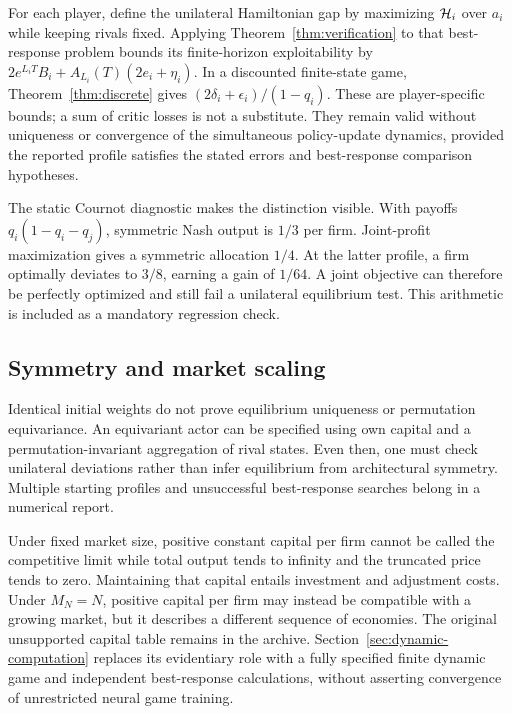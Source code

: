 For each player, define the unilateral Hamiltonian gap by maximizing $\mathcal H_i$ over $a_i$ while keeping rivals fixed. Applying Theorem~\ref{thm:verification} to that best-response problem bounds its finite-horizon exploitability by $2e^{L_iT}B_i+A_{L_i}(T)(2e_i+\eta_i)$. In a discounted finite-state game, Theorem~\ref{thm:discrete} gives $(2\delta_i+\epsilon_i)/(1-q_i)$. These are player-specific bounds; a sum of critic losses is not a substitute. They remain valid without uniqueness or convergence of the simultaneous policy-update dynamics, provided the reported profile satisfies the stated errors and best-response comparison hypotheses.

The static Cournot diagnostic makes the distinction visible. With payoffs $q_i(1-q_i-q_j)$, symmetric Nash output is $1/3$ per firm. Joint-profit maximization gives a symmetric allocation $1/4$. At the latter profile, a firm optimally deviates to $3/8$, earning a gain of $1/64$. A joint objective can therefore be perfectly optimized and still fail a unilateral equilibrium test. This arithmetic is included as a mandatory regression check.

\subsection{Symmetry and market scaling}
Identical initial weights do not prove equilibrium uniqueness or permutation equivariance. An equivariant actor can be specified using own capital and a permutation-invariant aggregation of rival states. Even then, one must check unilateral deviations rather than infer equilibrium from architectural symmetry. Multiple starting profiles and unsuccessful best-response searches belong in a numerical report.

Under fixed market size, positive constant capital per firm cannot be called the competitive limit while total output tends to infinity and the truncated price tends to zero. Maintaining that capital entails investment and adjustment costs. Under $M_N=N$, positive capital per firm may instead be compatible with a growing market, but it describes a different sequence of economies. The original unsupported capital table remains in the archive. Section~\ref{sec:dynamic-computation} replaces its evidentiary role with a fully specified finite dynamic game and independent best-response calculations, without asserting convergence of unrestricted neural game training.



